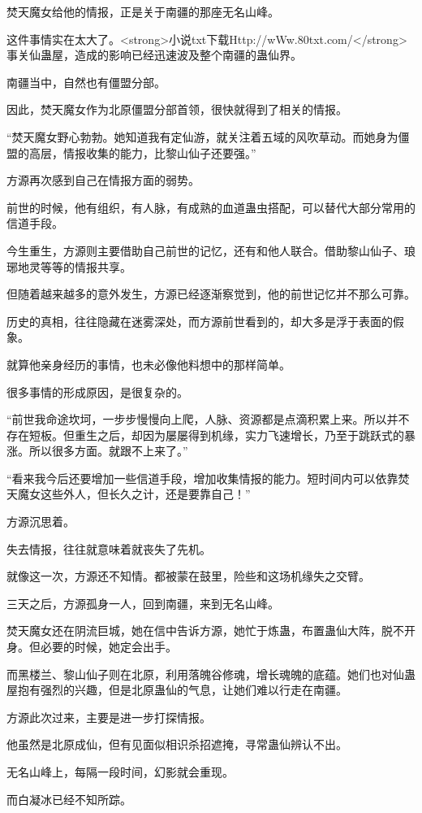 \begin{this_body}
焚天魔女给他的情报，正是关于南疆的那座无名山峰。

这件事情实在太大了。<strong>小说txt下载Http://wWw.80txt.com/</strong>事关仙蛊屋，造成的影响已经迅速波及整个南疆的蛊仙界。

南疆当中，自然也有僵盟分部。

因此，焚天魔女作为北原僵盟分部首领，很快就得到了相关的情报。

“焚天魔女野心勃勃。她知道我有定仙游，就关注着五域的风吹草动。而她身为僵盟的高层，情报收集的能力，比黎山仙子还要强。”

方源再次感到自己在情报方面的弱势。

前世的时候，他有组织，有人脉，有成熟的血道蛊虫搭配，可以替代大部分常用的信道手段。

今生重生，方源则主要借助自己前世的记忆，还有和他人联合。借助黎山仙子、琅琊地灵等等的情报共享。

但随着越来越多的意外发生，方源已经逐渐察觉到，他的前世记忆并不那么可靠。

历史的真相，往往隐藏在迷雾深处，而方源前世看到的，却大多是浮于表面的假象。

就算他亲身经历的事情，也未必像他料想中的那样简单。

很多事情的形成原因，是很复杂的。

“前世我命途坎坷，一步步慢慢向上爬，人脉、资源都是点滴积累上来。所以并不存在短板。但重生之后，却因为屡屡得到机缘，实力飞速增长，乃至于跳跃式的暴涨。所以很多方面。就跟不上来了。”

“看来我今后还要增加一些信道手段，增加收集情报的能力。短时间内可以依靠焚天魔女这些外人，但长久之计，还是要靠自己！”

方源沉思着。

失去情报，往往就意味着就丧失了先机。

就像这一次，方源还不知情。都被蒙在鼓里，险些和这场机缘失之交臂。

三天之后，方源孤身一人，回到南疆，来到无名山峰。

焚天魔女还在阴流巨城，她在信中告诉方源，她忙于炼蛊，布置蛊仙大阵，脱不开身。但必要的时候，她定会出手。

而黑楼兰、黎山仙子则在北原，利用落魄谷修魂，增长魂魄的底蕴。她们也对仙蛊屋抱有强烈的兴趣，但是北原蛊仙的气息，让她们难以行走在南疆。

方源此次过来，主要是进一步打探情报。

他虽然是北原成仙，但有见面似相识杀招遮掩，寻常蛊仙辨认不出。

无名山峰上，每隔一段时间，幻影就会重现。

而白凝冰已经不知所踪。


\end{this_body}
